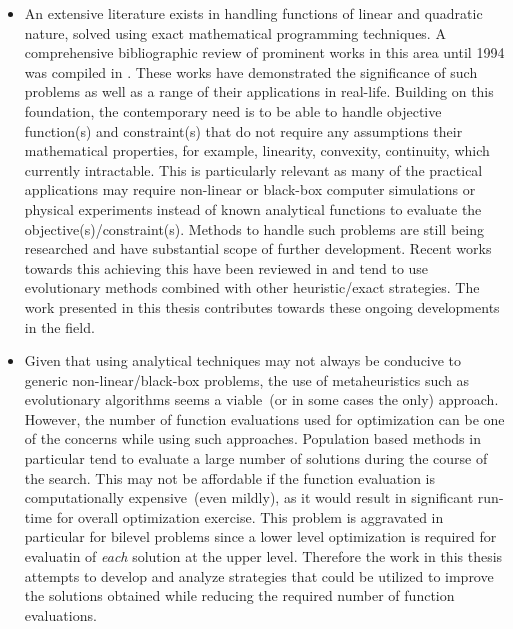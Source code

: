 \begin{itemize}

\item An extensive literature exists in handling functions of linear and quadratic nature, solved using exact mathematical programming techniques. A comprehensive bibliographic review of prominent works in this area until 1994 was compiled in \cite{vicente1994bilevel}. These works have demonstrated the significance of such problems as well as a range of their applications in real-life. Building on this foundation, the contemporary need is to be able to handle objective function(s) and constraint(s) that do not require any assumptions their mathematical properties, for example, linearity, convexity, continuity, which currently intractable. This is particularly relevant as many of the practical applications may require non-linear or black-box computer simulations or physical experiments instead of known analytical functions to evaluate the objective(s)/constraint(s). Methods to handle such problems are still being researched and have substantial scope of further development. Recent works towards this achieving this have been reviewed in \cite{colson2007overview,angelo2015study,Sinha2013,sinha2017review} and tend to use evolutionary methods combined with other heuristic/exact strategies. The work presented in this thesis contributes towards these ongoing developments in the field. 


\item Given that using analytical techniques may not always be conducive to generic non-linear/black-box problems, the use of metaheuristics such as evolutionary algorithms seems a viable~(or in some cases the only) approach. However, the number of function evaluations used for optimization can be one of the concerns while using such approaches. Population based methods in particular tend to evaluate a large number of solutions during the course of the search. This may not be affordable if the function evaluation is computationally expensive~(even mildly), as it would result in significant run-time for overall optimization exercise. This problem is aggravated in particular for bilevel problems since a lower level optimization is required for evaluatin of \emph{each} solution at the upper level. Therefore the work in this thesis attempts to develop and analyze strategies that could be utilized to improve the solutions obtained while reducing the required number of function evaluations. 

\end{itemize}


